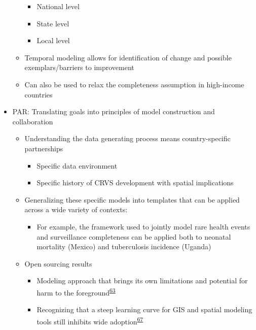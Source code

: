 \documentclass[
]{article}
\providecommand{\tightlist}{%
  \setlength{\itemsep}{0pt}\setlength{\parskip}{0pt}}
\begin{document}
\begin{itemize}
\begin{itemize}
    \begin{itemize}
    \tightlist
    \item
      National level
    \item
      State level
    \item
      Local level
    \end{itemize}
  \item
    Temporal modeling allows for identification of change and possible exemplars/barriers
    to improvement
  \item
    Can also be used to relax the completeness assumption in high-income countries
  \end{itemize}
\item
  PAR: Translating goals into principles of model construction and collaboration

  \begin{itemize}
  \tightlist
  \item
    Understanding the data generating process means country-specific partnerships

    \begin{itemize}
    \tightlist
    \item
      Specific data environment
    \item
      Specific history of CRVS development with spatial implications
    \end{itemize}
  \item
    Generalizing these specific models into templates that can be applied across a wide
    variety of contexts:

    \begin{itemize}
    \tightlist
    \item
      For example, the framework used to jointly model rare health events and surveillance
      completeness can be applied both to neonatal mortality (Mexico) and tuberculosis
      incidence (Uganda)
    \end{itemize}
  \item
    Open sourcing results

    \begin{itemize}
    \tightlist
    \item
      Modeling approach that brings its own limitations and potential for harm to the foreground\textsuperscript{\protect\hyperlink{ref-Cinnamon2020a}{63}}
    \item
      Recognizing that a steep learning curve for GIS and spatial modeling tools still inhibits wide adoption\textsuperscript{\protect\hyperlink{ref-Shannon2018}{67}}
    \end{itemize}
  \end{itemize}
\end{itemize}
\end{document}
